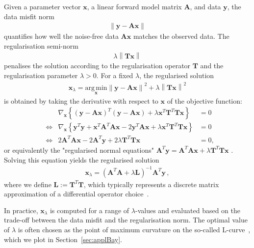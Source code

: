 Given a parameter vector $\bm{x}$, a linear forward model matrix $\bm{A}$, and data $\bm{y}$, the data misfit norm
\begin{align}
	\left\lVert \bm{y} - \bm{A} \bm{x} \right\rVert
\end{align}
quantifies how well the noise-free data  $\bm{A}\bm{x}$ matches the observed data.
The regularisation semi-norm
\begin{align}
	\lambda \left\lVert \bm{T} \bm{x} \right\rVert
\end{align}
penalises the solution according to the regularisation operator $\bm{T}$ and the regularisation parameter $\lambda > 0$.
For a fixed $\lambda$, the regularised solution
\begin{align}
	\bm{x}_{\lambda} = \underset{\bm{x}}{\mathrm{arg\,min}} \left\lVert \bm{y} - \bm{A} \bm{x} \right\rVert^2 + \lambda \left\lVert \bm{T} \bm{x} \right\rVert^2
\end{align}
is obtained by taking the derivative with respect to $\bm{x}$ of the objective function:
\begin{align}
	& & \nabla_{\bm{x}} \left\{ (\bm{y} - \bm{A} \bm{x})^T (\bm{y} - \bm{A} \bm{x}) + \lambda \bm{x}^T \bm{T}^T \bm{T} \bm{x} \right\} &= 0 \\
	&\iff & \nabla_{\bm{x}} \left\{ \bm{y}^T \bm{y} + \bm{x}^T \bm{A}^T \bm{A} \bm{x} - 2 \bm{y}^T \bm{A} \bm{x} + \lambda \bm{x}^T \bm{T}^T \bm{T} \bm{x} \right\} &= 0 \\
	&\iff & 2 \bm{A}^T \bm{A} \bm{x} - 2 \bm{A}^T \bm{y} + 2 \lambda \bm{T}^T \bm{T} \bm{x} &= 0,
\end{align}
or equivalently the "regularised normal equations" $\bm{A}^T \bm{y} = \bm{A}^T \bm{A} \bm{x} + \lambda \bm{T}^T \bm{T} \bm{x}$ \cite{Hansen2001LCurve}.
Solving this equation yields the regularised solution
\begin{align}
	\bm{x}_{\lambda} = (\bm{A}^T \bm{A} + \lambda \bm{L})^{-1} \bm{A}^T \bm{y} \, , \label{eq:regSol}
\end{align}
where we define $\bm{L} := \bm{T}^T \bm{T}$, which typically represents a discrete matrix approximation of a differential operator choice~\cite{tan2016LecNot}.

In practice, $\bm{x}_{\lambda}$ is computed for a range of $\lambda$-values and evaluated based on the trade-off between the data misfit and the regularisation norm. The optimal value of $\lambda$ is often chosen as the point of maximum curvature on the so-called L-curve~\cite{hansen1993use}, which we plot in Section~\ref{sec:applBay}.

